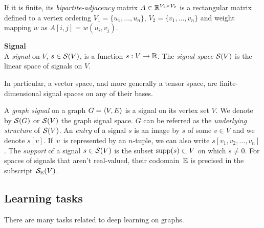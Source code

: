 
If it is finite, its \emph{bipartite-adjacency} matrix $A \in \mathbb{R}^{V_1 \times V_2}$ is a rectangular matrix defined \wrt to a vertex ordering $V_1 = \{u_1, \ldots, u_n\}$, $V_2 = \{v_1, \ldots, v_n\}$ and weight mapping $w$ as $A[i,j] = w(u_i,v_j)$.

\begin{definition}\textbf{Signal}\\
A \emph{signal} on $V$, $s \in \mathcal{S}(V)$, is a function $s: V \rightarrow \mathbb{R}$.
The \emph{signal space} $\mathcal{S}(V)$ is the linear space of signals on $V$.
\end{definition}

\begin{remark}
In particular, a vector space, and more generally a tensor space, are finite-dimensional signal spaces on any of their bases.
\end{remark}

A \emph{graph signal} on a graph $G = \langle V, E \rangle$ is a signal on its vertex set $V$. We denote by $\mathcal{S}(G)$ or $\mathcal{S}(V)$ the graph signal space. $G$ can be referred as the \emph{underlying structure} of $\mathcal{S}(V)$.
An \emph{entry} of a signal $s$ is an image by $s$ of some $v \in V$ and we denote $s[v]$. If~$v$~is represented by an $n$-tuple, we can also write $s[v_1, v_2, \ldots, v_n]$.
The \emph{support} of a signal $s \in \mathcal{S}(V)$ is the subset $\operatorname{supp}(s) \subset V$ on which $s \neq 0$.
For spaces of signals that aren't real-valued, their codomain~$\mathbb{E}$ is precised in the subscript~$\mathcal{S}_{\mathbb{E}}(V)$.

\subsection{Learning tasks}

There are many tasks related to deep learning on graphs.%

